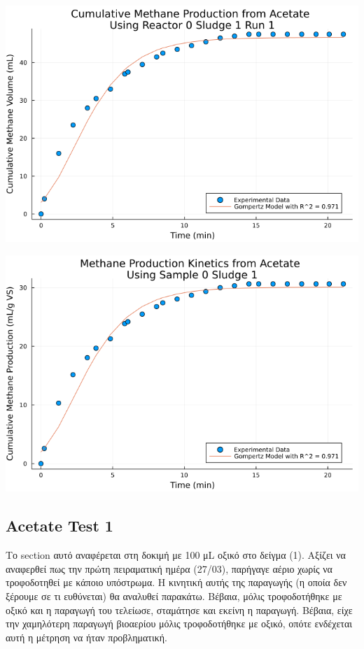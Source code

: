 \documentclass[11pt]{article}
\begin{document}
\begin{center}
\includegraphics[width=.9\linewidth]{../plots/BMPs/Acetate/methane_kinetics_acet_test_0_s1_min.png}
\end{center}

\begin{center}
\includegraphics[width=.9\linewidth]{../plots/BMPs/Acetate/specific_methane_kinetics_acet_test_0_s1.png}
\end{center}

\subsection{Acetate Test 1}
\label{sec:orgc48943d}
Το section αυτό αναφέρεται στη δοκιμή με 100 μL οξικό στο δείγμα (1). Aξίζει να αναφερθεί πως την πρώτη πειραματική ημέρα (27/03), παρήγαγε αέριο χωρίς να τροφοδοτηθεί με κάποιο υπόστρωμα. Η κινητική αυτής της παραγωγής (η οποία δεν ξέρουμε σε τι ευθύνεται) θα αναλυθεί παρακάτω. Βέβαια, μόλις τροφοδοτήθηκε με οξικό και η παραγωγή του τελείωσε, σταμάτησε και εκείνη η παραγωγή. Βέβαια, είχε την χαμηλότερη παραγωγή βιοαερίου μόλις τροφοδοτήθηκε με οξικό, οπότε ενδέχεται αυτή η μέτρηση να ήταν προβληματική.
\end{document}
